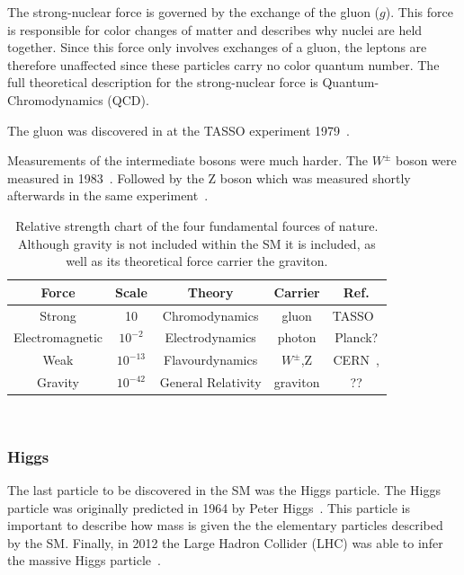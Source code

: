 The strong-nuclear force is governed by the exchange of the gluon ($g$).
This force is responsible for color changes of matter and describes why nuclei are held together.
Since this force only involves exchanges of a gluon, the leptons are therefore unaffected since these particles carry no color quantum number.
The full theoretical description for the strong-nuclear force is Quantum-Chromodynamics (QCD).

The gluon was discovered in at the TASSO experiment 1979~\citep{tasso_1978_BRANDELIK1979243, PETRA_PhysRevLett.43.830}.

Measurements of the intermediate bosons were much harder.
The $W^{\pm}$ boson were measured in 1983~\citep{wboson_measure_ARNISON1983103}.
Followed by the Z boson which was measured shortly afterwards in the same experiment~\citep{zboson_measure_1983398}.

\begin{table}
\begin{center}
\begin{tabular}{||c c c c c||}
 \hline
 Force & Scale & Theory & Carrier & Ref. \\ [0.5ex]
 \hline\hline
 Strong & 10 & Chromodynamics & gluon & TASSO~\citep{tasso_1978_BRANDELIK1979243} \\
 \hline
 Electromagnetic & $10^{-2} $ & Electrodynamics & photon & Planck? \\
 \hline
 Weak & $10^{-13}$ & Flavourdynamics & $W^{\pm}$,Z & CERN~\citep{wboson_measure_ARNISON1983103},\citep{zboson_measure_1983398}\\
 \hline
 Gravity & $10^{-42}$ & General Relativity & graviton  & ?? \\
 \hline
 \hline
\end{tabular}
\caption{Relative strength chart of the four fundamental fources of nature. Although gravity is not included within the SM it is included, as well as its theoretical force carrier the graviton.}
\end{center}
\end{table}
~\label{table:forces}

\subsubsection{Higgs}

The last particle to be discovered in the SM was the Higgs particle.
The Higgs particle was originally predicted in 1964 by Peter Higgs~\citep{HIGGS1964132}.
This particle is important to describe how mass is given the the elementary particles described by the SM.
Finally, in 2012 the Large Hadron Collider (LHC) was able to infer the massive Higgs particle~\citep{higgs_discovery_20121}.

